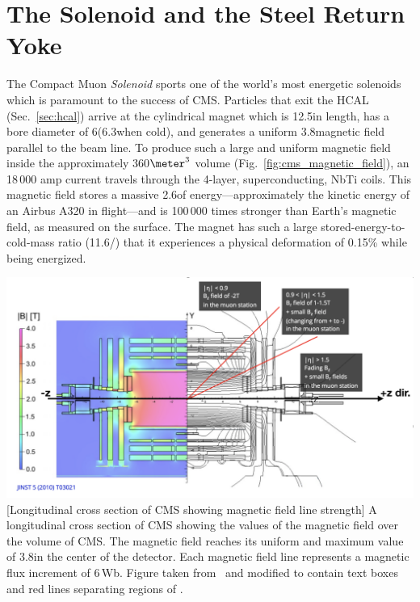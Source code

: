 \section{The Solenoid and the Steel Return Yoke}
\label{sec:solenoid}

The Compact Muon \emph{Solenoid} sports one of the world's most energetic solenoids which is paramount to the success of CMS.
Particles that exit the HCAL (Sec.~\ref{sec:hcal}) arrive at the cylindrical magnet which is 12.5\meter in length, has a bore diameter of 6\meter (6.3\meter when cold), and generates a uniform 3.8\tesla magnetic field parallel to the beam line.
To produce such a large and uniform magnetic field inside the approximately 360$\meter^3$ volume (Fig.~\ref{fig:cms_magnetic_field}), an 18\,000 amp current travels through the 4-layer, superconducting, NbTi coils.
This magnetic field stores a massive 2.6\GJ of energy---approximately the kinetic energy of an Airbus A320 in flight---and is 100\,000 times stronger than Earth's magnetic field, as measured on the surface.
The magnet has such a large stored-energy-to-cold-mass ratio (11.6\KJ/\Kgns) that it experiences a physical deformation of 0.15\% while being energized.
\begin{multiFigure}
    \centering
    \includegraphics[width=\textwidth]{figures/cms/solenoid/CMS_longitudinal_view_magnetic_field.png}
        [Longitudinal cross section of CMS showing magnetic field line strength]
        {A longitudinal cross section of CMS showing the values of the magnetic field over the volume of CMS. 
        The magnetic field reaches its uniform and maximum value of 3.8\tesla in the center of the detector.
        Each magnetic field line represents a magnetic flux increment of 6\,Wb.
        Figure taken from~\cite{mag_field_lines} and modified to contain text boxes and red lines separating regions of \abseta.
        }
    \label{fig:cms_magnetic_field}
\end{multiFigure}

